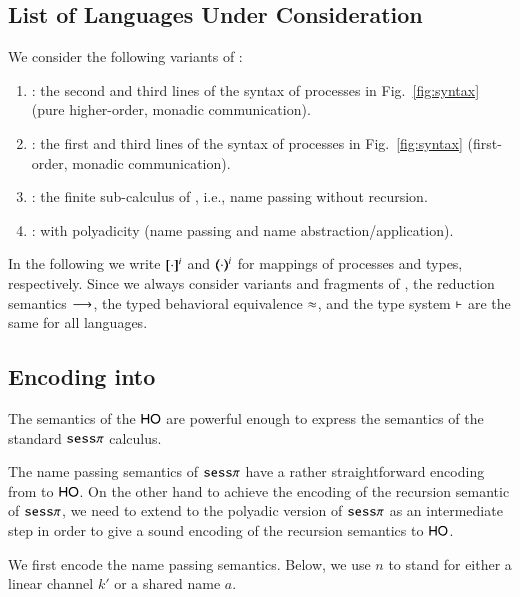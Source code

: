 \subsection{List of Languages Under Consideration}
We consider the following variants of \HOp:
\begin{enumerate}[-]
	\item \HO: the second and third lines of the syntax of processes in Fig.~\ref{fig:syntax} (pure higher-order, monadic communication).
	\item \sesp: the first and third lines of the syntax of processes in Fig.~\ref{fig:syntax} (first-order, monadic communication).
	\item \sespnr: the finite sub-calculus of \sesp, i.e., name passing without recursion.
	\item \pHOp: \HOp with polyadicity (name passing and name abstraction/application).
\end{enumerate}
\noindent
In the following we write $[\!\![\cdot]\!\!]^i$
and $(\!\!\langle\cdot\rangle\!\!)^i$ 
for mappings of processes and types, respectively.
Since we always consider variants and fragments of \HOp, the 
 reduction semantics $\longrightarrow$, the typed behavioral equivalence $\approx$, and the type system $\vdash$ are the same for all languages.



\subsection{Encoding \sespnr  into \HO}

The semantics of the $\mathsf{HO}$ are powerful enough to
express the semantics of the standard $\mathtt{sess}\pi$ calculus.

The name passing semantics of $\mathtt{sess}\pi$ have a rather straightforward
encoding from to $\mathsf{HO}$.
On the other hand to achieve the encoding of the recursion semantic
of $\mathtt{sess}\pi$, we need to extend
to the polyadic version of $\mathtt{sess}\pi$ as an intermediate step in order
to give a sound encoding of the recursion semantics to $\mathsf{HO}$.

We first encode the name passing semantics. Below, we use $n$ to stand for either a linear channel $k'$ or a shared name $a$.

